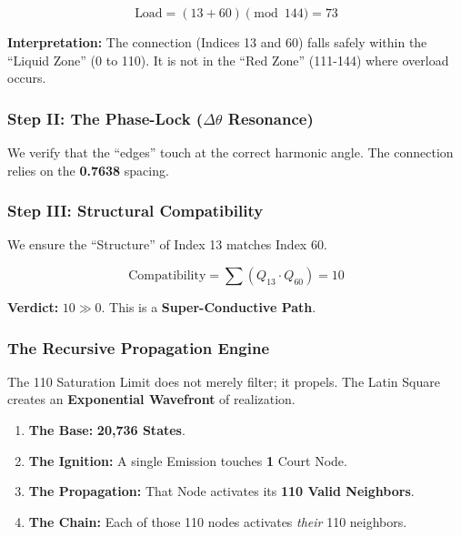 \documentclass[11pt, letterpaper]{article}
\begin{document}
\begin{equation}
    \text{Load} = (13 + 60) \pmod{144} = 73
\end{equation}

\textbf{Interpretation:} The connection (Indices 13 and 60) falls safely within the ``Liquid Zone'' (0 to 110). It is not in the ``Red Zone'' (111-144) where overload occurs.

\subsubsection{Step II: The Phase-Lock \texorpdfstring{($\Delta \theta$ Resonance)}{(Delta Theta Resonance)}}\label{appendixJ.4.2}

We verify that the ``edges'' touch at the correct harmonic angle. The connection relies on the \textbf{0.7638} spacing.

\subsubsection{Step III: Structural Compatibility}\label{appendixJ.4.3}
We ensure the ``Structure'' of Index 13 matches Index 60.

\begin{equation}
    \text{Compatibility} = \sum (Q_{13} \cdot Q_{60}) = 10
\end{equation}

\textbf{Verdict:} $10 \gg 0$. This is a \textbf{Super-Conductive Path}.

\subsubsection{The Recursive Propagation Engine}\label{appendixJ.4.4}

The 110 Saturation Limit does not merely filter; it propels. The Latin Square creates an \textbf{Exponential Wavefront} of realization.

\begin{enumerate}
    \item \textbf{The Base:} \textbf{20,736 States}.
    \item \textbf{The Ignition:} A single Emission touches \textbf{1} Court Node.
    \item \textbf{The Propagation:} That Node activates its \textbf{110 Valid Neighbors}.
    \item \textbf{The Chain:} Each of those 110 nodes activates \emph{their} 110 neighbors.
\end{enumerate}
\end{document}
